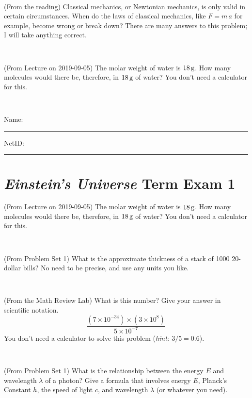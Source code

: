 \documentclass[12pt, letterpaper]{article}
\begin{document}
\vfill ~

\begin{problem} (From the reading)
Classical mechanics, or Newtonian mechanics, is only valid in certain
circumstances. When do the laws of classical mechanics, like $F =
m\,a$ for example, become wrong or break down? There are many answers
to this problem; I will take anything correct.
\end{problem}


\vfill ~

\begin{problem} (From Lecture on 2019-09-05)
The molar weight of water is $18\,\mathrm{g}$. How many molecules would there
be, therefore, in $18\,\mathrm{g}$ of water? You don't need a calculator for
this.
\end{problem}


\vfill ~


\cleardoublepage



\noindent
Name: \rule[-1ex]{0.60\textwidth}{0.1pt}
NetID: \rule[-1ex]{0.20\textwidth}{0.1pt}

\section*{\textsl{Einstein's Universe} Term Exam 1}
\setcounter{problem}{1}


\begin{problem} (From Lecture on 2019-09-05)
The molar weight of water is $18\,\mathrm{g}$. How many molecules would there
be, therefore, in $18\,\mathrm{g}$ of water? You don't need a calculator for
this.
\end{problem}


\vfill ~

\begin{problem} (From Problem Set 1)
What is the approximate thickness of a stack of 1000 20-dollar bills?
No need to be precise, and use any units you like.
\end{problem}


\vfill ~

\begin{problem} (From the Math Review Lab)
What is this number? Give your answer in scientific notation.
$$
\frac{(7\times10^{-34})\times(3\times10^8)}{5\times10^{-7}}
$$
You don't need a calculator to solve this problem (\textit{hint: $3/5=0.6$}).
\end{problem}


\vfill ~

\begin{problem} (From Problem Set 1)
What is the relationship between the energy $E$ and wavelength
$\lambda$ of a photon? Give a formula that involves energy $E$,
Planck's Constant $h$, the speed of light $c$, and wavelength
$\lambda$ (or whatever you need).
\end{problem}
\end{document}
